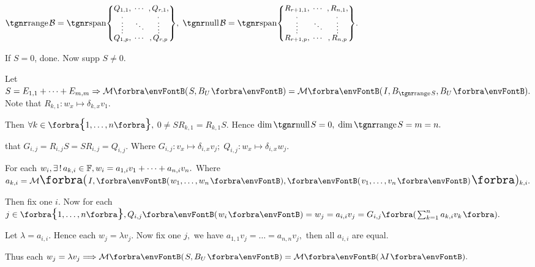 $\range\mB=\Spn{\small\begin{Bmatrix} \underset{\;,}{Q_{1,1}}, &\hspace{-6pt} \cdots &\hspace{-6pt} ,\underset{\!\!,}{Q_{r,1}},\\[-2pt] \vdots &\hspace{-6pt} \ddots &\hspace{-6pt} \vdots\\[-2pt] \overset{\;,}{Q_{1,p}}, &\hspace{-6pt} \cdots &\hspace{-6pt} ,\overset{\!\!\!,}{Q_{r,p}}\end{Bmatrix}},\;\null\mB=\Spn{\small\begin{Bmatrix} \underset{\;,}{R_{r+1,1}}, &\hspace{-6pt} \cdots &\hspace{-6pt} ,\underset{\!\!,}{R_{n,1}},\\[-2pt] \vdots &\hspace{-6pt} \ddots &\hspace{-6pt} \vdots\\[-2pt] \overset{\;,}{R_{r+1,p}}, &\hspace{-6pt} \cdots &\hspace{-6pt} ,\overset{\!\!\!,}{R_{n,p}}\end{Bmatrix}}.$\PfEnd[-14pt]
\SepLine\pagebreak

If $S=0$, done. Now supp $S\neq 0.${\FontSmall\hfill{}}\par\quad
{\vspace{2pt}Let {$S=E_{1,1}+\dots+E_{m,m}\Rightarrow \Mt{S,B_U}=\Mt{I,B_{\range S},B_U}.$} Note that $R_{k,1}:w_x\mapsto\delta_{k,x}v_1.$}\par\quad
{\vspace{2pt}Then $\forall k\in\Bra{1,\dots,n},$ {\FontLarge$0\neq SR_{k,1}=R_{k,1}S.$} Hence $\dim\null S=0,\;\dim\range S=m=n.$}\par\quad
{\vspace{2pt}\NOTICE that {\FontLarge$G_{i,j}=R_{i,j}S=SR_{i,j}=Q_{i,j}$}. Where $G_{i,j}:v_x\mapsto\delta_{i,x}v_j;\;Q_{i,j}:w_x\mapsto\delta_{i,x}w_j.$}\par\quad
For each $w_i,\exists\,!\,a_{k,i}\in{\mathbb{F}},w_i=a_{1,i}v_1+\dots+a_{n,i}v_n.$ Where $a_{k,i}=\Mt[\BigPar]{I,\Par{w_1,\dots,w_n},\Par{v_1,\dots,v_n}}{_{k,i}}.$\par\quad
Then fix one $i.$ Now for each $j\in\Bra{1,\dots,n},Q_{i,j}\Par{w_i}=w_j=a_{i,i}v_j=G_{i,j}\BigBigPar{{\sum_{k=1}^na_{k,i} v_k}}.$\par\quad
Let $\lambda=a_{i,i}.$ Hence each $w_j=\lambda v_j.$ Now fix one $j,$ we have $a_{1,1}v_j=\dots=a_{n,n}v_j,$ then all $a_{i,i}$ are equal.\par\quad
Thus each $w_j=\lambda v_j\Longrightarrow\Mt{S,B_U}=\Mt{\lambda I}.$\PfEnd
\SepLine

